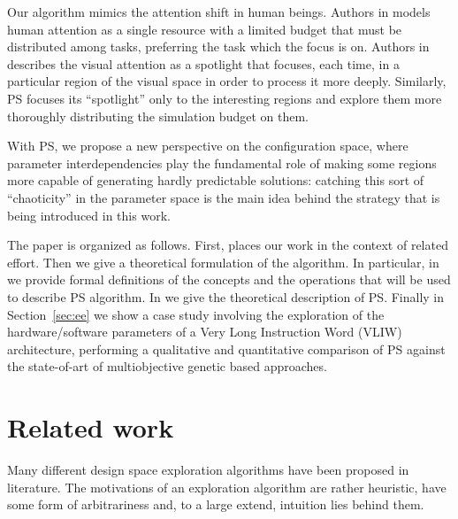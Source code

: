 Our algorithm mimics the attention shift in human beings. Authors in \cite{attention} models human attention as a single resource with a limited budget that must be distributed among tasks, preferring the task which the focus is on.
 Authors in \cite{spatial_attention} describes the visual attention as a spotlight that focuses, each time, in a particular region of the visual space in order to process it more deeply. Similarly, PS focuses its ``spotlight'' only to the interesting regions and explore them more thoroughly distributing the simulation budget on them.

With PS, we propose a new
perspective on the configuration space, where parameter
interdependencies play the fundamental role of making some regions
more capable of generating hardly predictable solutions: catching this
sort of ``chaoticity'' in the parameter space is the main idea behind
the strategy that is being introduced in this work.


The paper is organized as follows. First,  places our work in the context of related effort.
Then we give a theoretical formulation of the algorithm. In particular, in  we provide formal definitions of the concepts and the operations that will be used to describe PS algorithm. In  we give the theoretical description of PS. 
Finally in Section~\ref{sec:ee} we show a case
study involving the exploration of the hardware/software parameters of
a Very Long Instruction Word (VLIW) architecture, performing a
qualitative and quantitative comparison of PS against the state-of-art
of multiobjective genetic based approaches.


\section{Related work}
Many different design space exploration algorithms have been proposed
in literature.  The motivations of an exploration
algorithm are rather heuristic, have some form of arbitrariness and,
to a large extend, intuition lies behind them.

